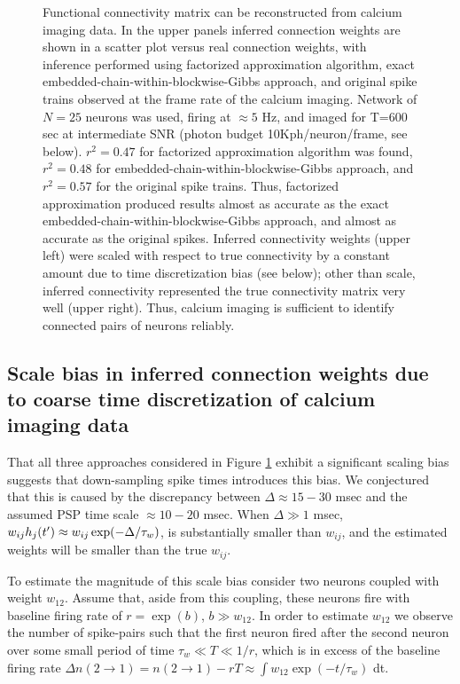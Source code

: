 \begin{figure}[h]
\caption{Functional connectivity matrix can be reconstructed from calcium imaging data. In the upper panels inferred connection weights are shown in a scatter plot versus real connection weights, with inference performed using factorized approximation algorithm, exact embedded-chain-within-blockwise-Gibbs approach, and original spike trains observed at the frame rate of the calcium imaging. Network of $N=25$ neurons was used, firing at $\approx 5$ Hz, and imaged for T=600 sec at intermediate SNR (photon budget 10Kph/neuron/frame, see below). $r^2=0.47$ for factorized approximation algorithm was found, $r^2=0.48$ for embedded-chain-within-blockwise-Gibbs approach, and $r^2=0.57$ for the original spike trains. Thus, factorized approximation produced results almost as accurate as the exact embedded-chain-within-blockwise-Gibbs approach, and almost as accurate as the original spikes. Inferred connectivity weights (upper left) were scaled with respect to true connectivity by a constant amount due to time discretization bias (see below); other than scale, inferred connectivity represented the true connectivity matrix very well (upper right). Thus, calcium imaging is sufficient to identify connected pairs of neurons reliably.} \label{fig:scatters} \end{figure}

\subsection{Scale bias in inferred connection weights due to coarse time discretization of calcium imaging data}

That all three approaches considered in Figure \ref{fig:scatters} exhibit a significant scaling bias suggests that down-sampling spike times introduces this bias.  We conjectured that this is caused by the discrepancy between $\Delta \approx 15-30$ msec and the assumed PSP time scale $\approx 10-20$ msec. When $\Delta \gg 1$ msec, $w_{ij} h_j(t') \approx w_{ij} \exp(-\Delta/\tau_w)$, is substantially smaller than $w_{ij}$, and the estimated weights will be smaller than the true $w_{ij}$.

To estimate the magnitude of this scale bias consider two neurons coupled with weight $w_{12}$. Assume that, aside from this coupling, these neurons fire with baseline firing rate of $r=\exp(b)$, $b \gg w_{12}$. In order to estimate $w_{12}$ we observe the number of spike-pairs such that the first neuron fired after the second neuron over some small period of time $\tau_w \ll T \ll 1/r$, which is in excess of the baseline firing rate $\Delta n(2\rightarrow 1) = n(2\rightarrow 1) - r T \approx \int  w_{12} \exp(-t/\tau_w)$ dt.

